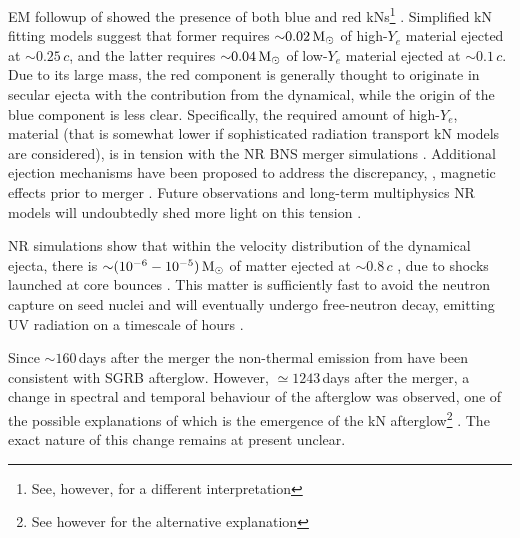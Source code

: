 \ac{EM} followup of \GW{} showed the presence of both blue and red \acp{kN}\footnote{
    See, however, \citet{Waxman:2017sqv} for a different interpretation
} \citep{Villar:2017wcc}.
Simplified \ac{kN} fitting models suggest that former requires ${\sim}0.02\,{\text{M}_{\odot}}$ of high-$Y_e$ 
material ejected at ${\sim}0.25\,c$, and the latter requires ${\sim}0.04\,{\text{M}_{\odot}}$ of low-$Y_e$ 
material ejected at ${\sim}0.1\,c$. Due to its large mass, the red component is 
generally thought to originate in secular ejecta with the contribution from the dynamical, while 
the origin of the blue component is less clear. Specifically, the required amount of high-$Y_e$,
material (that is somewhat lower if sophisticated radiation transport \ac{kN} models are considered),
is in tension with the \ac{NR} \ac{BNS} merger simulations 
\citep{Sekiguchi:2016bjd,Siegel:2019mlp,Perego:2017wtu,Kawaguchi:2018ptg}.
Additional ejection mechanisms have been proposed to address the discrepancy, \eg, 
magnetic effects prior to merger \citep{Metzger:2018qfl,Fernandez:2018kax,Radice:2018ghv}. 
Future observations and long-term multiphysics \ac{NR} models will undoubtedly shed more light on this tension \citep{Metzger:2018qfl}.

\ac{NR} simulations show that within the velocity distribution of the dynamical ejecta, 
there is ${\sim}(10^{-6}-10^{-5})\,{\text{M}_{\odot}}$ of matter ejected at ${\sim}0.8\,c$ 
\citep{Metzger:2014yda,Hotokezaka:2018gmo,Radice:2018pdn,Radice:2018ghv}, due to shocks launched 
at core bounces \citep{Radice:2018pdn}.
This matter is sufficiently fast to avoid the neutron capture on seed nuclei 
and will eventually undergo free-neutron decay, emitting 
\ac{UV} radiation on a timescale of hours \citep{Metzger:2014yda}. 

Since ${\sim}160\,$days after the merger the non-thermal emission from \GW{} have been 
consistent with \ac{SGRB} afterglow. However, ${\simeq}1243\,$days after the merger, a 
change in spectral and temporal behaviour of the afterglow was observed, one of the 
possible explanations of which is the emergence of the \ac{kN} afterglow\footnote{
    See however \citet{Troja:2021xsw} for the alternative explanation
} \citep{Hajela:2021faz}.
The exact nature of this change remains at present unclear. 


